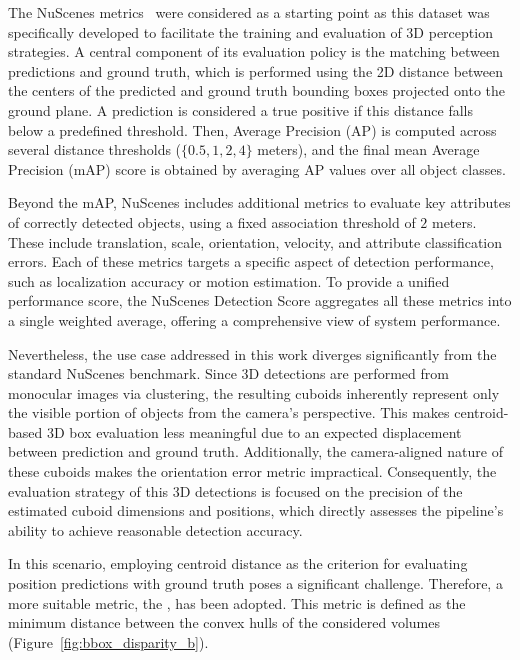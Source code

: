  \label{sec:3d_det_evaluation}

The NuScenes metrics~\cite{nuscenes} were considered as a starting point as this dataset was specifically developed to facilitate the training and evaluation of 3D perception strategies. A central component of its evaluation policy is the matching between predictions and ground truth, which is performed using the 2D distance between the centers of the predicted and ground truth bounding boxes projected onto the ground plane. A prediction is considered a true positive if this distance falls below a predefined threshold. Then, Average Precision (AP) is computed across several distance thresholds ($\{0.5, 1, 2, 4\}$ meters), and the final mean Average Precision (mAP) score is obtained by averaging AP values over all object classes.

Beyond the mAP, NuScenes includes additional metrics to evaluate key attributes of correctly detected objects, using a fixed association threshold of $2$ meters. These include translation, scale, orientation, velocity, and attribute classification errors. Each of these metrics targets a specific aspect of detection performance, such as localization accuracy or motion estimation. To provide a unified performance score, the NuScenes Detection Score aggregates all these metrics into a single weighted average, offering a comprehensive view of system performance.

Nevertheless, the use case addressed in this work diverges significantly from the standard NuScenes benchmark. Since 3D detections are performed from monocular images via clustering, the resulting cuboids inherently represent only the visible portion of objects from the camera's perspective. This makes centroid-based 3D box evaluation less meaningful due to an expected displacement between prediction and ground truth. Additionally, the camera-aligned nature of these cuboids makes the orientation error metric impractical. Consequently, the evaluation strategy of this 3D detections is focused on the precision of the estimated cuboid dimensions and positions, which directly assesses the pipeline's ability to achieve reasonable detection accuracy.

In this scenario, employing centroid distance as the criterion for evaluating position predictions with ground truth poses a significant challenge. Therefore, a more suitable metric, the , has been adopted. This metric is defined as the minimum distance between the convex hulls of the considered volumes (Figure~\ref{fig:bbox_disparity_b}).

